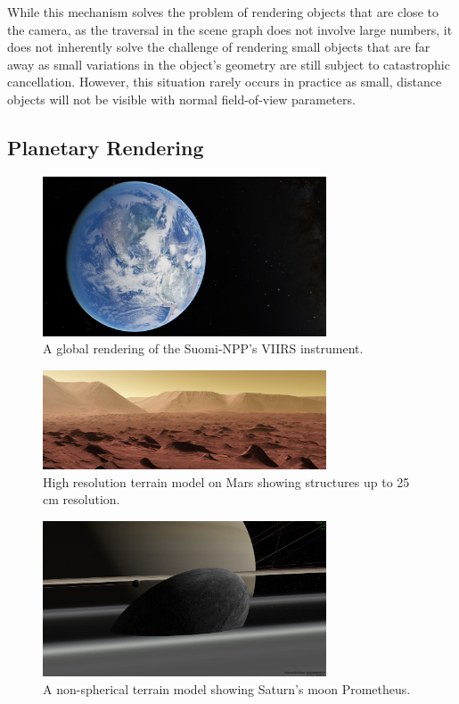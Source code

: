 While this mechanism solves the problem of rendering objects that are close to the camera, as the traversal in the scene graph does not involve large numbers, it does not inherently solve the challenge of rendering small objects that are far away as small variations in the object's geometry are still subject to catastrophic cancellation.  However, this situation rarely occurs in practice as small, distance objects will not be visible with normal field-of-view parameters.



\subsection{Planetary Rendering} \label{contributions:astro:gb}
\begin{figure}
\centering
\includegraphics[width=0.75\textwidth]{figures/contributions/gb/earth.png}
\caption{A global rendering of the Suomi-NPP's VIIRS instrument.}
\label{contributions:astro:gb:earth}
\end{figure}

\begin{figure}
\centering
\includegraphics[width=0.75\textwidth]{figures/contributions/gb/mars.png}
\caption{High resolution terrain model on Mars showing structures up to 25\,cm resolution.}
\label{contributions:astro:gb:mars}
\end{figure}

\begin{figure}
\centering
\includegraphics[width=0.75\textwidth]{figures/contributions/gb/prometheus.png}
\caption{A non-spherical terrain model showing Saturn's moon Prometheus.}
\label{contributions:astro:gb:prometheus}
\end{figure}

